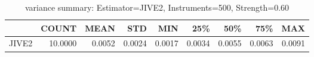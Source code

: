 \begin{table}[ht]
\centering
\caption{variance summary: Estimator=JIVE2, Instruments=500, Strength=0.60}
\begin{tabular}{lrrrrrrrr}
\toprule
 & COUNT & MEAN & STD & MIN & 25\% & 50\% & 75\% & MAX \\
\midrule
JIVE2 & 10.0000 & 0.0052 & 0.0024 & 0.0017 & 0.0034 & 0.0055 & 0.0063 & 0.0091 \\
\bottomrule
\end{tabular}
\end{table}

